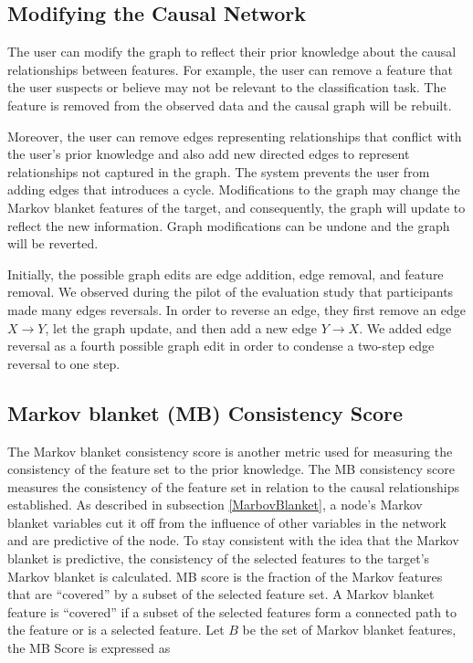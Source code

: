 \subsection{Modifying the Causal Network}
The user can modify the graph to reflect their prior knowledge about the causal relationships between features. For example, the user can remove a feature that the user suspects or believe may not be relevant to the classification task. The feature is removed from the observed data and the causal graph will be rebuilt.

Moreover, the user can remove edges representing relationships that conflict with the user’s prior knowledge and also add new directed edges to represent relationships not captured in the graph. The system prevents the user from adding edges that introduces a cycle. Modifications to the graph may change the Markov blanket features of the target, and consequently, the graph will update to reflect the new information. Graph modifications can be undone and the graph will be reverted.

Initially, the possible graph edits are edge addition, edge removal, and feature removal. We observed during the pilot of the evaluation study that participants made many edges reversals. In order to reverse an edge, they first remove an edge $X \rightarrow Y$, let the graph update, and then add a new edge $Y \rightarrow X$. We added edge reversal as a fourth possible graph edit in order to condense a two-step edge reversal to one step.

\subsection{Markov blanket (MB) Consistency Score} \label{MBConsistencySubsection}
The Markov blanket consistency score is another metric used for measuring the consistency of the feature set to the prior knowledge. The MB consistency score measures the consistency of the feature set in relation to the causal relationships established. As described in subsection \ref{MarbovBlanket}, a node's Markov blanket variables cut it off from the influence of other variables in the network and are predictive of the node. To stay consistent with the idea that the Markov blanket is predictive, the consistency of the selected features to the target's Markov blanket is calculated. MB score is the fraction of the Markov features that are “covered” by a subset of the selected feature set. A Markov blanket feature is “covered” if a subset of the selected features form a connected path to the feature or is a selected feature. Let \(B\) be the set of Markov blanket features, the MB Score is expressed as


